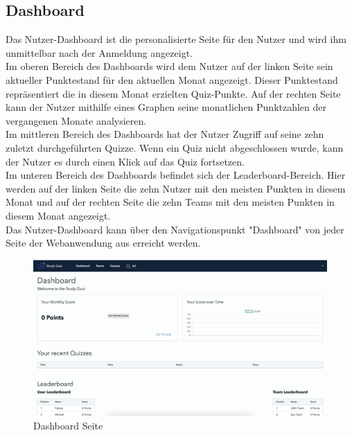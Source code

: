 \subsection*{Dashboard}

Das Nutzer-Dashboard ist die personalisierte Seite für den Nutzer und wird ihm unmittelbar nach 
der Anmeldung angezeigt. \\

\noindent Im oberen Bereich des Dashboards wird dem Nutzer auf der linken Seite sein aktueller Punktestand für 
den aktuellen Monat angezeigt. Dieser Punktestand repräsentiert die in diesem Monat erzielten Quiz-Punkte. 
Auf der rechten Seite kann der Nutzer mithilfe eines Graphen seine monatlichen Punktzahlen der 
vergangenen Monate analysieren. \\

\noindent Im mittleren Bereich des Dashboards hat der Nutzer Zugriff auf seine zehn zuletzt durchgeführten Quizze. 
Wenn ein Quiz nicht abgeschlossen wurde, kann der Nutzer es durch einen Klick auf das Quiz fortsetzen. \\

\noindent Im unteren Bereich des Dashboards befindet sich der Leaderboard-Bereich. Hier werden auf der linken Seite 
die zehn Nutzer mit den meisten Punkten in diesem Monat und auf der rechten Seite die zehn Teams mit 
den meisten Punkten in diesem Monat angezeigt. \\

\noindent Das Nutzer-Dashboard kann über den Navigationspunkt "Dashboard" von jeder Seite der Webanwendung 
aus erreicht werden. \\


\begin{figure}[H]
  \includegraphics[width=\linewidth]{img/dashboard.png}
  \caption{Dashboard Seite}
  \label{fig:dashboard}
\end{figure}

